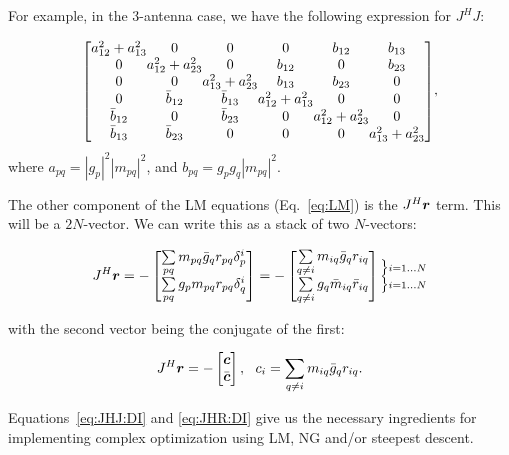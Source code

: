 \documentclass[useAMS,usenatbib]{mn2e}
\newcommand{\JJ}{J} %
\begin{document}
For example, in the 3-antenna case, we have the following expression for
$\JJ^H \JJ$:

\newcommand{\yysq}[2]{{a^2_{#1}+a^2_{#2}}}
\newcommand{\bb}[1]{{b_{#1}}}
\newcommand{\bbb}[1]{{\bar{b}_{#1}}}
\[
{\scriptstyle
\Matrix{c@{}c@{}c@{}c@{}c@{}c}{
\yysq{12}{13} & 0             & 0             & 0             & \bb{12}       & \bb{13} \\
0             & \yysq{12}{23} & 0             & \bb{12}       & 0             & \bb{23} \\
0             & 0             & \yysq{13}{23} & \bb{13}       & \bb{23}       & 0       \\
0             & \bbb{12}      & \bbb{13}      & \yysq{12}{13} & 0             & 0       \\ 
\bbb{12}      & 0             & \bbb{23}      & 0             & \yysq{12}{23} & 0 \\
\bbb{13}      & \bbb{23}      & 0             & 0             & 0             &  \yysq{13}{23}  
}
},
\]
where $a_{pq}=|g_p|^2|m_{pq}|^2$, and $b_{pq}=g_p g_q |m_{pq}|^2$.

The other component of the LM equations (Eq.~\ref{eq:LM}) is the $\JJ^H\bmath{r}$ term. This will be a
$2N$-vector. We can write this as a stack of two $N$-vectors:


\begin{equation}
\label{eq:JHR:DI}
\JJ^H\bmath{r} = -\Matrix{c}{ 
\sum\limits_{pq} m_{pq}\bar{g}_q r_{pq} \delta^{i}_p  \\
\sum\limits_{pq} g_p m_{pq} r_{pq} \delta^{i}_q 
} = -\Matrix{c}{
\sum\limits_{q\ne i} m_{iq}\bar{g}_q r_{iq}   \\
\sum\limits_{q\ne i} g_q \bar{m}_{iq} \bar{r}_{iq}  
}
\Stack{ 
\big \} \scriptstyle i=1\dots N \\ 
\big \} \scriptstyle i=1\dots N 
}
\end{equation}

with the second vector being the conjugate of the first:

\begin{equation}
\label{eq:JHR:DI1}
\JJ^H\bmath{r} = -\Matrix{c}{\bmath{c}\\\bar{\bmath{c}}},~~c_i = \sum\limits_{q\ne i} m_{iq}\bar{g}_q r_{iq}.
\end{equation}

Equations~\ref{eq:JHJ:DI} and \ref{eq:JHR:DI} give us the necessary ingredients for implementing complex
optimization using LM, NG and/or steepest descent. 
\end{document}

